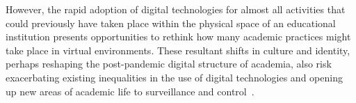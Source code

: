 \documentclass[sigconf]{acmart}
\begin{document}
However, the rapid adoption of digital technologies for almost all
activities that could previously have taken place within the physical
space of an educational institution presents opportunities to rethink
how many academic practices might take place in virtual
environments. These resultant shifts in culture and identity, perhaps
reshaping the post-pandemic digital structure of academia, also risk
exacerbating existing inequalities in the use of digital technologies
and opening up new areas of academic life to surveillance and
control~\cite{carriganlseblog:2020}.




\end{document}
